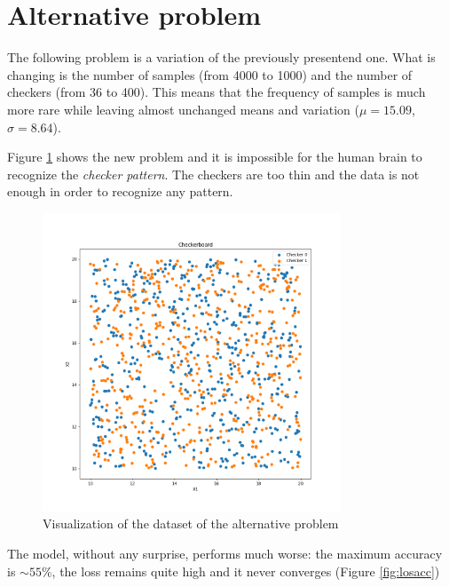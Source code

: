 \documentclass[compsoc]{IEEEtran}
\begin{document}
\section{Alternative problem}
The following problem is a variation of the previously presentend one. What is changing is the number of samples (from 4000 to 1000) and the number of checkers (from 36 to 400). This means that the frequency of samples is much more rare while leaving almost unchanged means and variation ($\mu=15.09$, $\sigma=8.64$). \par
Figure \ref{fig:checkerboard2} shows the new problem and it is impossible for the human brain to recognize the \emph{checker pattern}. The checkers are too thin and the data is not enough in order to recognize any pattern. \par
\begin{figure}[ht!]
\centering                                                                        
\includegraphics[width=3.5in]{../images/checkerboard-2.png}
\captionsetup{justification=centering}                                                                                                                                   
\caption{Visualization of the dataset of the alternative problem}
\label{fig:checkerboard2}                                                                                                                                                           
\end{figure}
The model, without any surprise, performs much worse: the maximum accuracy is $\sim55\%$, the loss remains quite high and it never converges (Figure \ref{fig:losacc})
\end{document}
